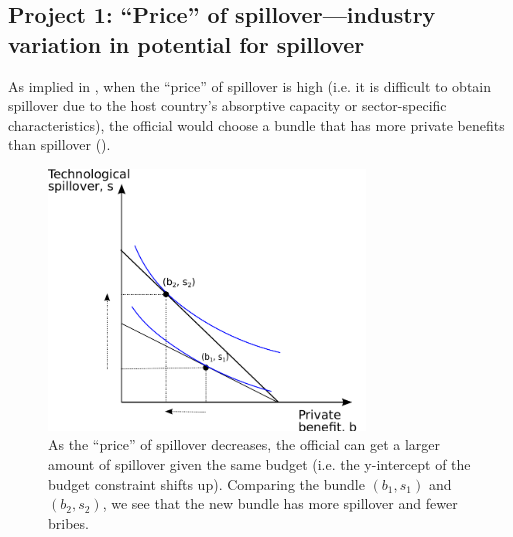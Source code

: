 \subsection{Project 1: ``Price'' of spillover---industry variation in potential for spillover}
\label{sec:rd_potential_for_spillover}

As implied in , when the ``price'' of spillover is high (i.e. it is difficult to obtain spillover due to the host country's absorptive capacity or sector-specific characteristics), the official would choose a bundle that has more private benefits than spillover (). 

\begin{figure}[!ht]
	\centering
    \includegraphics[width=0.75\textwidth, height=0.75\textheight,keepaspectratio]{../figure/price_of_spillover}
    \caption{As the ``price'' of spillover decreases, the official can get a larger amount of spillover given the same budget (i.e. the y-intercept of the budget constraint shifts up). Comparing the bundle $(b_1, s_1)$ and $(b_2, s_2)$, we see that the new bundle has more spillover and fewer bribes.}
    \label{fig:price_of_spillover}
\end{figure}

